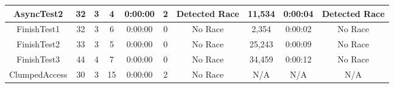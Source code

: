 \begin{table*}[h]
\begin{tabular}{|c|c|c|c|c|c|c|c|c|c|}
AsyncTest2 & 32 & 3 & 4 & 0:00:00 & 2 & Detected Race & 11,534 & 0:00:04 
& Detected Race \\ \hline
FinishTest1 & 32 & 3 & 6 & 0:00:00 & 0 & No Race & 2,354 & 0:00:02 & No Race
\\ \hline
FinishTest2 & 33 & 3 & 5 & 0:00:00 & 0 & No Race & 25,243 & 0:00:09 & No Race
\\ \hline
FinishTest3 & 44 & 4 & 7 & 0:00:00 & 0 & No Race & 34,459 & 0:00:12 & No Race
\\ \hline
ClumpedAccess & 30 & 3 & 15 & 0:00:00 & 2 & No Race & N/A & N/A & N/A
\\ \hline
\end{tabular}
\end{table*}

